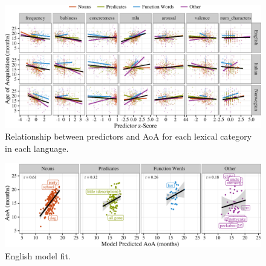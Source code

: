 \documentclass[10pt, letterpaper]{article}
\newenvironment{CodeChunk}{}{}
\begin{document}
\begin{CodeChunk}
\begin{figure}[!h]

{\centering \includegraphics{figs/data-1} 

}

\caption[Relationship between predictors and AoA for each lexical category in each language]{Relationship between predictors and AoA for each lexical category in each language.}\label{fig:data}
\end{figure}
\end{CodeChunk}

\begin{CodeChunk}
\begin{figure}[tb]

{\centering \includegraphics{figs/fit-1} 

}

\caption[English model fit]{English model fit.}\label{fig:fit}
\end{figure}
\end{CodeChunk}
\end{document}
